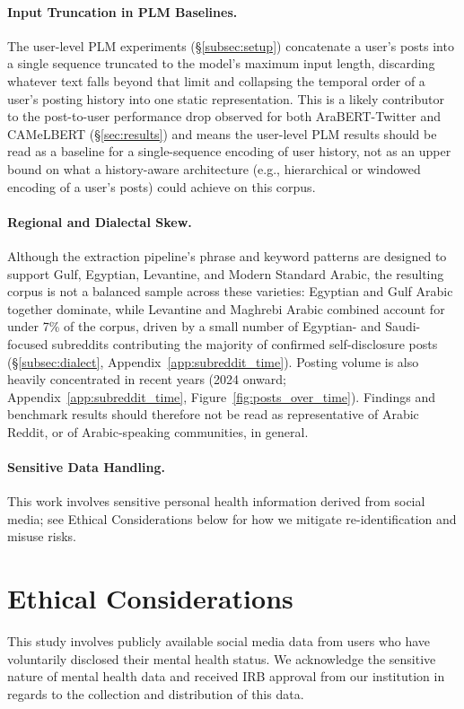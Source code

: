 \documentclass[letterpaper]{article} %
\begin{document}
\paragraph{Input Truncation in PLM Baselines.}
The user-level PLM experiments (\S\ref{subsec:setup}) concatenate a user's posts into a single sequence truncated to the model's maximum input length, discarding whatever text falls beyond that limit and collapsing the temporal order of a user's posting history into one static representation. This is a likely contributor to the post-to-user performance drop observed for both AraBERT-Twitter and CAMeLBERT (§\ref{sec:results}) and means the user-level PLM results should be read as a baseline for a single-sequence encoding of user history, not as an upper bound on what a history-aware architecture (e.g., hierarchical or windowed encoding of a user's posts) could achieve on this corpus.

\paragraph{Regional and Dialectal Skew.}
Although the extraction pipeline's phrase and keyword patterns are designed to support Gulf, Egyptian, Levantine, and Modern Standard Arabic, the resulting corpus is not a balanced sample across these varieties: Egyptian and Gulf Arabic together dominate, while Levantine and Maghrebi Arabic combined account for under 7\% of the corpus, driven by a small number of Egyptian- and Saudi-focused subreddits contributing the majority of confirmed self-disclosure posts (§\ref{subsec:dialect}, Appendix~\ref{app:subreddit_time}). Posting volume is also heavily concentrated in recent years (2024 onward; Appendix~\ref{app:subreddit_time}, Figure~\ref{fig:posts_over_time}). Findings and benchmark results should therefore not be read as representative of Arabic Reddit, or of Arabic-speaking communities, in general.

\paragraph{Sensitive Data Handling.}
\label{par:sensitive_data}
This work involves sensitive personal health information derived from social media; see Ethical Considerations below for how we mitigate re-identification and misuse risks.


\section*{Ethical Considerations}
\label{sec:ethics}
This study involves publicly available social media data from users who have voluntarily disclosed their mental health status. We acknowledge the sensitive nature of mental health data and received IRB approval from our institution in regards to the collection and distribution of this data.
\end{document}
